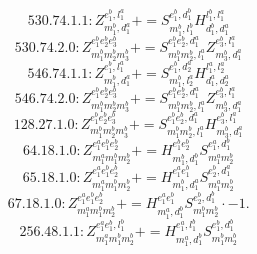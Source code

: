 \documentclass[letterpaper,10pt,fleqn,leqno,onecolumn]{article}
\begin{document}
\begin{equation} \;\;\;\;\;\;  530.74.1.1: Z^{e_{1}^{b},l_{1}^{a}}_{m_{1}^{b},d_{1}^{a}}+=S^{e_{1}^{b},d_{1}^{b}}_{m_{1}^{b},l_{1}^{b}}H^{l_{1}^{b},l_{1}^{a}}_{d_{1}^{b},d_{1}^{a}} \end{equation}
\begin{equation} \;\;\;\;\;\;  530.74.2.0: Z^{e_{1}^{b}e_{2}^{b}e_{3}^{b}}_{m_{1}^{b}m_{2}^{b}m_{3}^{b}}+=S^{e_{1}^{b}e_{2}^{b},d_{1}^{a}}_{m_{1}^{b}m_{2}^{b},l_{1}^{a}}Z^{e_{3}^{b},l_{1}^{a}}_{m_{3}^{b},d_{1}^{a}} \end{equation}
\begin{equation} \;\;\;\;\;\;  546.74.1.1: Z^{e_{1}^{b},l_{1}^{a}}_{m_{1}^{b},d_{1}^{a}}+=S^{e_{1}^{b},d_{2}^{a}}_{m_{1}^{b},l_{2}^{a}}H^{l_{1}^{a},l_{2}^{a}}_{d_{1}^{a},d_{2}^{a}} \end{equation}
\begin{equation} \;\;\;\;\;\;  546.74.2.0: Z^{e_{1}^{b}e_{2}^{b}e_{3}^{b}}_{m_{1}^{b}m_{2}^{b}m_{3}^{b}}+=S^{e_{1}^{b}e_{2}^{b},d_{1}^{a}}_{m_{1}^{b}m_{2}^{b},l_{1}^{a}}Z^{e_{3}^{b},l_{1}^{a}}_{m_{3}^{b},d_{1}^{a}} \end{equation}
\begin{equation} \;\;\;\;\;\;  128.27.1.0: Z^{e_{1}^{b}e_{2}^{b}e_{3}^{b}}_{m_{1}^{b}m_{2}^{b}m_{3}^{b}}+=S^{e_{1}^{b}e_{2}^{b},d_{1}^{a}}_{m_{1}^{b}m_{2}^{b},l_{1}^{a}}H^{e_{3}^{b},l_{1}^{a}}_{m_{3}^{b},d_{1}^{a}} \end{equation}
\begin{equation} \;\;\;\;\;\;  64.18.1.0: Z^{e_{1}^{a}e_{1}^{b}e_{2}^{b}}_{m_{1}^{a}m_{1}^{b}m_{2}^{b}}+=H^{e_{1}^{b}e_{2}^{b}}_{m_{1}^{b},d_{1}^{b}}S^{e_{1}^{a},d_{1}^{b}}_{m_{1}^{a}m_{2}^{b}} \end{equation}
\begin{equation} \;\;\;\;\;\;  65.18.1.0: Z^{e_{1}^{a}e_{1}^{b}e_{2}^{b}}_{m_{1}^{a}m_{1}^{b}m_{2}^{b}}+=H^{e_{1}^{a}e_{1}^{b}}_{m_{1}^{b},d_{1}^{a}}S^{e_{2}^{b},d_{1}^{a}}_{m_{1}^{a}m_{2}^{b}} \end{equation}
\begin{equation} \;\;\;\;\;\;  67.18.1.0: Z^{e_{1}^{a}e_{1}^{b}e_{2}^{b}}_{m_{1}^{a}m_{1}^{b}m_{2}^{b}}+=H^{e_{1}^{a}e_{1}^{b}}_{m_{1}^{a},d_{1}^{b}}S^{e_{2}^{b},d_{1}^{b}}_{m_{1}^{b}m_{2}^{b}}\cdot -1. \end{equation}
\begin{equation} \;\;\;\;\;\;  256.48.1.1: Z^{e_{1}^{a}e_{1}^{b},l_{1}^{b}}_{m_{1}^{a}m_{1}^{b}m_{2}^{b}}+=H^{e_{1}^{a},l_{1}^{b}}_{m_{1}^{a},d_{1}^{b}}S^{e_{1}^{b},d_{1}^{b}}_{m_{1}^{b}m_{2}^{b}} \end{equation}
\end{document}
